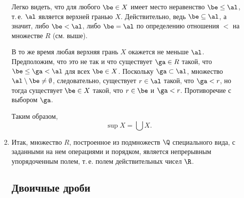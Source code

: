 \begin{enumerate}
Легко видеть, что для любого $\be\in X$ имеет место неравенство $\be\le\al$, т.\,е. $\al$ является верхней гранью $X$.
Действительно, ведь $\be\subseteq\al$, а значит, либо $\be<\al$, либо $\be=\al$ по определению отношения $<$ на множестве $R$ (см. выше).

В то же время любая верхняя грань $X$ окажется не меньше $\al$. Предположим, что это не так и что существует $\ga\in R$ такой, что $\be\le\ga<\al$ для всех $\be\in X$. Поскольку $\ga\subset \al$, множество $\al\setminus\be\ne\emptyset$, следовательно, существует $r\in\al$ такой, что $\ga<r$, но тогда существует $\be\in X$ такой, что $r\in\be$ и $\ga<r$. Противоречие с выбором $\ga$.

Таким образом,
$$
\sup X=\bigcup X.
$$
\item Итак, множество $R$, построенное из подмножеств $\Q$ специального вида, с заданными на нем операциями и порядком, является непрерывным упорядоченным полем, т.\,е. полем действительных чисел $\R$.




\subsection*{Двоичные дроби}




\end{enumerate}
